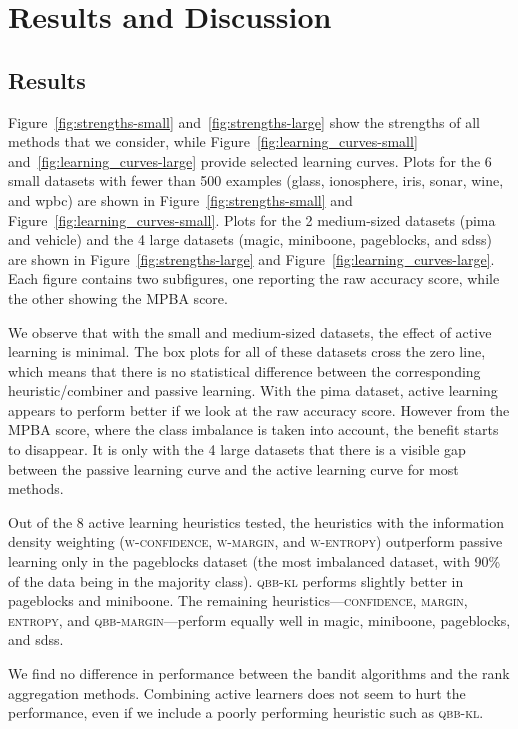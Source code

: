 \documentclass[fleqn,10pt,lineno]{wlpeerj} %
\begin{document}
\section{Results and Discussion}\label{sec:discuss}

\subsection{Results}

Figure~\ref{fig:strengths-small} and~\ref{fig:strengths-large} show the
strengths of all methods that we consider, while
Figure~\ref{fig:learning_curves-small} and~\ref{fig:learning_curves-large}
provide selected learning curves. Plots for the 6 small datasets with fewer
than 500 examples (glass, ionosphere, iris, sonar, wine, and wpbc) are shown in
Figure~\ref{fig:strengths-small} and Figure~\ref{fig:learning_curves-small}.
Plots for the 2 medium-sized datasets (pima and vehicle) and the 4 large
datasets (magic, miniboone, pageblocks, and sdss) are shown in
Figure~\ref{fig:strengths-large} and Figure~\ref{fig:learning_curves-large}.
Each figure contains two subfigures, one reporting the raw accuracy score,
while the other showing the MPBA score.

We observe that with the small and medium-sized datasets, the effect of active
learning is minimal. The box plots for all of these datasets cross the zero
line, which means that there is no statistical difference between the
corresponding heuristic/combiner and passive learning. With the pima dataset,
active learning appears to perform better if we look at the raw accuracy score.
However from the MPBA score, where the class imbalance is taken into account,
the benefit starts to disappear. It is only with the 4 large datasets that
there is a visible gap between the passive learning curve and the active
learning curve for most methods.

Out of the 8 active learning heuristics tested, the heuristics with the
information density weighting (\textsc{w-confidence},
\textsc{w-margin}, and \textsc{w-entropy}) outperform passive learning only in
the pageblocks dataset (the most imbalanced dataset, with 90\% of the data
being in the majority class). \textsc{qbb-kl} performs slightly better in
pageblocks and miniboone. The remaining heuristics---\textsc{confidence},
\textsc{margin}, \textsc{entropy}, and \textsc{qbb-margin}---perform equally
well in magic, miniboone, pageblocks, and sdss.

We find no difference in performance between the bandit algorithms and
the rank aggregation methods. Combining active learners does not seem
to hurt the performance, even if we include a poorly performing heuristic
such as \textsc{qbb-kl}.
\end{document}

